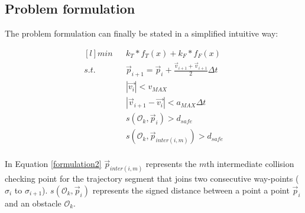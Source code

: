 \subsection{Problem formulation}
\label{section:formulations}

The problem formulation can finally be stated in a simplified intuitive way:

\begin{equation}
    \begin{matrix*}[l]
    min && k_T * f_T(x) + k_F * f_F(x)  \\
    s.t.&& \vec{p}_{i+1}=\vec{p}_{i} + \frac{\vec{v}_{i+1}+ \vec{v}_{i+1} }{2}\Delta t\\
        && |\vec{v_i}| < v_{MAX}\\
        && |\vec{v}_{i+1}-\vec{v_i}| < a_{MAX} \Delta t\\
        && s(\mathcal{O}_k, \vec{p}_i) >  d_{safe}\\
        && s(\mathcal{O}_k, \vec{p}_{inter (i,m)} ) >  d_{safe}\\
    \end{matrix*}
    \label{formulation2}
\end{equation}

In Equation \ref{formulation2} $\vec{p}_{inter (i,m)}$ represents the $m$th intermediate collision checking point for the trajectory segment that joins two consecutive way-points ($\sigma_i$ to $\sigma_{i+1}$). $s(\mathcal{O}_k, \vec{p}_i) $ represents the signed distance between a point a point $\vec{p}_i$ and an obstacle $\mathcal{O}_k$.
